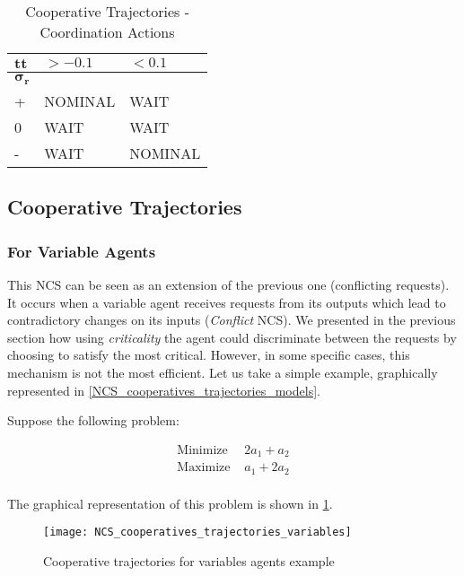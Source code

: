 \begin{table}[htbp]
\caption{Cooperative Trajectories - Coordination Actions}\label{coord_act}
\centering
\begin{tabular}{l|ll}
		\toprule
		$\boldsymbol{tt}$ & $>-0.1$ & $< 0.1$\\
		\midrule
		$\boldsymbol{\sigma_r}$ &&\\
		+ & NOMINAL & WAIT\\
		0 & WAIT & WAIT\\
		- & WAIT & NOMINAL\\
		\bottomrule
\end{tabular}
\end{table}

\subsection{Cooperative Trajectories}

\subsubsection{For Variable Agents}

This NCS can be seen as an extension of the previous one (conflicting requests). It occurs when a variable agent receives requests from its outputs which lead to contradictory changes on its inputs (\emph{Conflict} NCS). We presented in the previous section how using \emph{criticality} the agent could discriminate between the requests by choosing to satisfy the most critical. However, in some specific cases, this mechanism is not the most efficient. Let us take a simple example, graphically represented in \figurename{} \ref{NCS_cooperatives_trajectories_models}.

Suppose the following problem:

\begin{align*}
\text{Minimize } &2a_1 + a_2\\
\text{Maximize } &a_1 + 2a_2\\
\end{align*}

The graphical representation of this problem is shown in \figurename{} \ref{NCS_cooperatives_trajectories_variables}.

\begin{figure}
\centering
\texttt{[image: NCS\_cooperatives\_trajectories\_variables]}
\caption{Cooperative trajectories for variables agents example}\label{NCS_cooperatives_trajectories_variables}
\end{figure}


